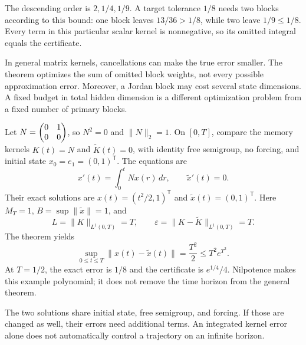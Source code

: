 The descending order is $2,1/4,1/9$. A target tolerance $1/8$ needs two blocks according to this bound: one block leaves $13/36>1/8$, while two leave $1/9\le1/8$. Every term in this particular scalar kernel is nonnegative, so its omitted integral equals the certificate.

In general matrix kernels, cancellations can make the true error smaller. The theorem optimizes the sum of omitted block weights, not every possible approximation error. Moreover, a Jordan block may cost several state dimensions. A fixed budget in total hidden dimension is a different optimization problem from a fixed number of primary blocks.

Let $N=\begin{pmatrix}0&1\\0&0\end{pmatrix}$, so $N^2=0$ and $\|N\|_2=1$. On $[0,T]$, compare the memory kernels $K(t)=N$ and $\widetilde K(t)=0$, with identity free semigroup, no forcing, and initial state $x_0=e_1=(0,1)^{\mathsf T}$. The equations are
\[
x'(t)=\int_0^t N x(r)\,dr,\qquad
\widetilde x'(t)=0.
\]
Their exact solutions are $x(t)=(t^2/2,1)^{\mathsf T}$ and $\widetilde x(t)=(0,1)^{\mathsf T}$.
Here $M_T=1$, $B=\sup\|\widetilde x\|=1$, and
\[
L=\|K\|_{L^1(0,T)}=T,\qquad
\varepsilon=\|K-\widetilde K\|_{L^1(0,T)}=T.
\]
The theorem yields
\[
\sup_{0\le t\le T}\|x(t)-\widetilde x(t)\|
=\frac{T^2}{2}\le T^2e^{T^2}.
\]
At $T=1/2$, the exact error is $1/8$ and the certificate is $e^{1/4}/4$. Nilpotence makes this example polynomial; it does not remove the time horizon from the general theorem.

The two solutions share initial state, free semigroup, and forcing. If those are changed as well, their errors need additional terms. An integrated kernel error alone does not automatically control a trajectory on an infinite horizon.

